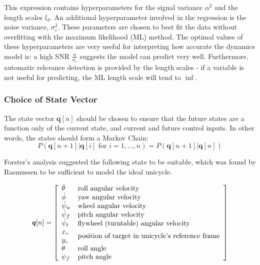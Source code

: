 \documentclass{IIBproject}
\begin{document}
This expression contains hyperparameters for the signal variance $\alpha^2$
and the length scales $l_d$. An additional hyperparameter involved in the
regression is the noise variance, $\sigma_\varepsilon^2$. These parameters are
chosen to best fit the data without overfitting with the maximum likelihood
(ML) method\cite{ref:gpml}. The optimal values of these hyperparameters are
very useful for interpreting how accurate the dynamics model is: a high SNR
$\frac{\alpha}{\sigma_\varepsilon}$ suggests the model can predict very
well.  Furthermore, automatic relevance detection is provided by the length
scales - if a variable is not useful for predicting, the ML length scale will
tend to $\inf$.

\subsubsection{Choice of State Vector}

The state vector $\boldsymbol{q}[n]$ should be chosen to ensure that the
future states are a function only of the current state, and current and future
control inputs. In other words, the states should form a Markov Chain:
\[
  P(\boldsymbol{q}[n+1] | \boldsymbol{q}[i]\textrm{ for } i = 1, \dots, n)
  = P(\boldsymbol{q}[n+1] | \boldsymbol{q}[n])
\]

Forster's analysis suggested the following state to be suitable, which was
found by Rasmussen to be sufficient to model the ideal unicycle.

\[
\boldsymbol{q}[n] = \left[ \begin{array}{ll}
  \dot{\theta} & \textrm{roll angular velocity} \\
  \dot{\phi} & \textrm{yaw angular velocity} \\
  \dot{\psi}_w & \textrm{wheel angular velocity} \\
  \dot{\psi}_f & \textrm{pitch angular velocity} \\
  \dot{\psi}_t & \textrm{flywheel (turntable) angular velocity} \\
  x_c & \multirow{2}{*}{\textrm{position of target in unicycle's reference
  frame}} \\
  y_c & \\
  \theta & \textrm{roll angle} \\
  \psi_f & \textrm{pitch angle} \\
\end{array}\right]
\]
\end{document}

